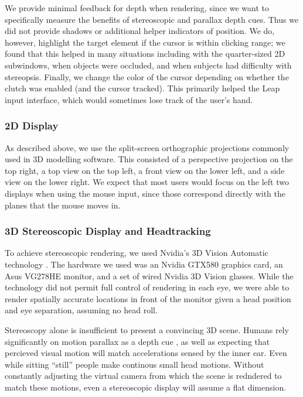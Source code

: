 We provide minimal feedback for depth when rendering, since we want to
specifically measure the benefits of stereoscopic and parallax depth
cues. Thus we did not provide shadows or additional helper indicators of
position. We do, however, highlight the target element if the cursor is within
clicking range; we found that this helped in many situations including with
the quarter-sized 2D subwindows, when objects were occluded, and when subjects
had difficulty with stereopsis. Finally, we change the color of the cursor
depending on whether the clutch was enabled (and the cursor tracked). This
primarily helped the Leap input interface, which would sometimes lose track of
the user's hand.

\subsubsection{2D Display}
As described above, we use the split-screen orthographic projections commonly
used in 3D modelling software. This consisted of a perspective projection on
the top right, a top view on the top left, a front view on the lower left, and
a side view on the lower right. We expect that most users would focus on the
left two displays when using the mouse input, since those correspond directly
with the planes that the mouse moves in.

\subsubsection{3D Stereoscopic Display and Headtracking}
To achieve stereoscopic rendering, we used Nvidia's 3D Vision Automatic
technology \cite{nvidia3dvision}. The hardware we used was an Nvidia GTX580
graphics card, an Asus VG278HE monitor, and a set of wired Nvidia 3D Vision
glasses. While the technology did not permit full control of rendering in each
eye, we were able to render spatially accurate locations in front of the
monitor given a head position and eye separation, assuming no head roll.

Stereoscopy alone is insufficient to present a convincing 3D scene.  Humans
rely significantly on motion parallax as a depth cue \cite{parallax}, as well
as expecting that percieved visual motion will match accelerations sensed by
the inner ear.  Even while sitting ``still'' people make continous small head
motions.  Without constantly adjusting the virtual camera from which the scene
is redndered to match these motions, even a stereoscopic display will assume a
flat dimension.

